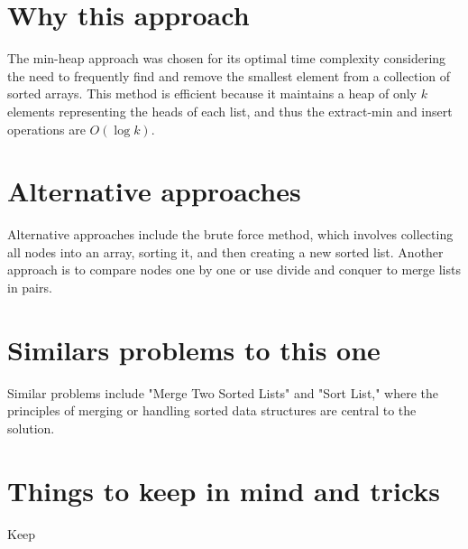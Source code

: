 \section*{Why this approach}
The min-heap approach was chosen for its optimal time complexity considering the need to frequently find and remove the smallest element from a collection of sorted arrays. This method is efficient because it maintains a heap of only \(k\) elements representing the heads of each list, and thus the extract-min and insert operations are \(O(\log k)\).

\section*{Alternative approaches}
Alternative approaches include the brute force method, which involves collecting all nodes into an array, sorting it, and then creating a new sorted list. Another approach is to compare nodes one by one or use divide and conquer to merge lists in pairs.

\section*{Similars problems to this one}
Similar problems include "Merge Two Sorted Lists" and "Sort List," where the principles of merging or handling sorted data structures are central to the solution.

\section*{Things to keep in mind and tricks}
Keep